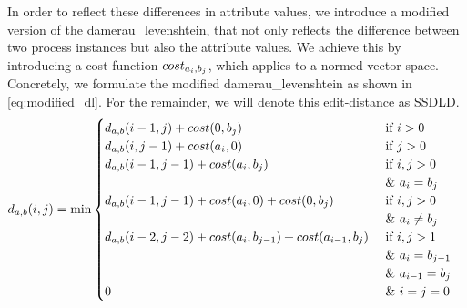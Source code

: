 \documentclass[./../../paper.tex]{subfiles}
\begin{document}
\noindent In order to reflect these differences in attribute values, we introduce a modified version of the \gls{damerau_levenshtein}, that not only reflects the difference between two process instances but also the attribute values. We achieve this by introducing a cost function $cost_{a_i, b_j}$, which applies to a normed vector-space\footnotemark. Concretely, we formulate the modified \gls{damerau_levenshtein} as shown in \autoref{eq:modified_dl}. For the remainder, we will denote this edit-distance as \gls{SSDLD}.
\begin{align}
    \label{eq:modified_dl}
    d_{a, b}(i, j) & =\min
    \begin{cases}
        d_{a, b}(i-1, j  )+cost(0, b_j) & \text { if } i>0                                            \\
        d_{a, b}(i  , j-1)+cost(a_i, 0) & \text { if } j>0                                            \\
        d_{a, b}(i-1, j-1)+cost(a_i, b_j) & \text { if } i, j>0   \\ & \text { \& } a_{i}=b_{j}                                       \\
        d_{a, b}(i-1, j-1)+cost(a_i, 0) + cost(0, b_j) & \text { if } i, j>0  \\ & \text { \& } a_{i} \neq b_{j}                                       \\
        d_{a, b}(i-2, j-2)+cost(a_i, b_{j-1}) + cost(a_{i-1}, b_j) & \text { if } i, j>1 \\ 
        & \text { \& } a_{i}=b_{j-1} \\ 
        & \text { \& } a_{i-1}=b_{j} \\
        0                                 & \text { \& } i=j=0                                          
    \end{cases} 
\end{align}
\end{document}
